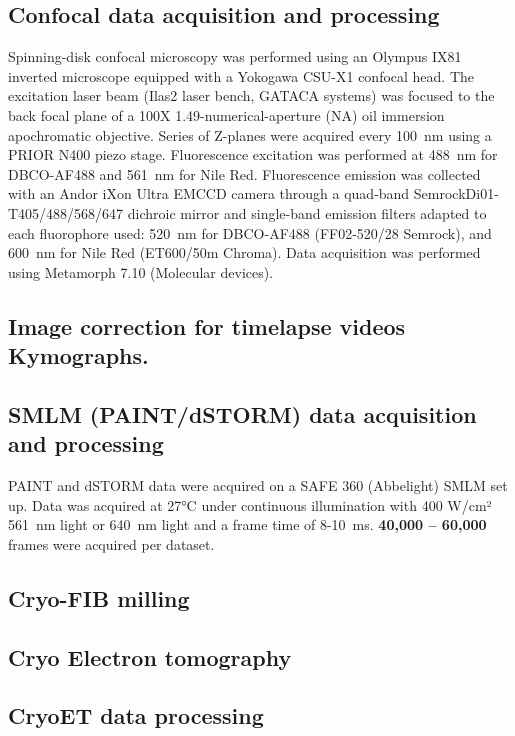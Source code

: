\subsection{Confocal data acquisition and processing}

Spinning-disk confocal microscopy was performed using an Olympus IX81 inverted microscope equipped with a Yokogawa CSU-X1 confocal head.
The excitation laser beam (Ilas2 laser bench, GATACA systems) was focused to the back focal plane of a 100X 1.49-numerical-aperture (NA) oil immersion apochromatic objective.
Series of Z-planes were acquired every \qty{100}{nm} using a PRIOR N400 piezo stage.
Fluorescence excitation was performed at \qty{488}{nm} for DBCO-AF488 and \qty{561}{nm} for Nile Red.
Fluorescence emission was collected with an Andor iXon Ultra EMCCD camera through a quad-band Semrock\texttrademark Di01-T405/488/568/647 dichroic mirror and single-band emission filters adapted to each fluorophore used: \qty{520}{nm} for DBCO-AF488 (FF02-520/28 Semrock\texttrademark), and \qty{600}{nm} for Nile Red (ET600/50m Chroma\texttrademark).
Data acquisition was performed using Metamorph 7.10 (Molecular devices).

\subsection{Image correction for timelapse videos Kymographs.}

\subsection{SMLM (PAINT/dSTORM) data acquisition and processing}

PAINT and dSTORM data were acquired on a SAFE 360 (Abbelight) SMLM set up.
Data was acquired at \ang{27}C under continuous illumination with 400 W/cm² \qty{561}{nm} light or \qty{640}{nm} light and a frame time of 8-\qty{10}{ms}.
\textbf{40,000 -- 60,000} frames were acquired per dataset.

\subsection{Cryo-FIB milling}

\subsection{Cryo Electron tomography}

\subsection{CryoET data processing}

